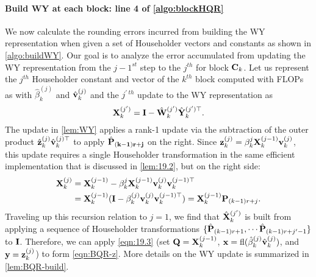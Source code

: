 \paragraph{Build WY at each block: line 4 of \cref{algo:blockHQR}}
We now calculate the rounding errors incurred from building the WY representation when given a set of Householder vectors and constants as shown in \cref{algo:buildWY}.
Our goal is to analyze the error accumulated from updating the WY representation from the $j-1^{st}$ step to the $j^{th}$ for block $\mathbf{C}_{k}$.
Let us represent the $j^{th}$ Householder constant and vector of the $k^{th}$ block computed with FLOPs as with $\hat{\beta}_k^{(j)}$ and $\hat{\mathbf{v}}_{k}^{(j)}$ and the $j^{'\ th}$ update to the WY representation as $$\mathbf{X}_{k}^{(j')} = \mathbf{I} - \hat{\mathbf{W}}_{k}^{(j')}\hat{\mathbf{Y}}_{k}^{(j')\top}.$$ %
The update in \cref{lem:WY} applies a rank-1 update via the subtraction of the outer product $\hat{\mathbf{z}}_{k}^{(j)}\hat{\mathbf{v}}_{k}^{(j)\top}$ to apply $\hat{\mathbf{P}}_{\mathbf{(k-1)r+j}}$ on the right. 
Since $\mathbf{z}_{k}^{(j)} = \beta_k^{j}\mathbf{X}_{k}^{(j-1)}\mathbf{v}_{k}^{(j)}$, this update requires a single Householder transformation in the same efficient implementation that is discussed in \cref{lem:19.2}, but on the right side:
\begin{align*}
	\mathbf{X}_{k}^{(j)} &= \mathbf{X}_{k}^{(j-1)}-\beta_k^{j}\mathbf{X}_{k}^{(j-1)}\mathbf{v}_{k}^{(j)}\mathbf{v}_{k}^{(j-1)\top} \\
	&= \mathbf{X}_{k}^{(j-1)} (\mathbf{I}-\beta_k^{(j)}\mathbf{v}_{k}^{(j)}\mathbf{v}_{k}^{(j-1)\top})=  \mathbf{X}_{k}^{(j-1)}\mathbf{P}_{(k-1)r+j}.
\end{align*}
Traveling up this recursion relation to $j=1$, we find that $\hat{\mathbf{X}}_{k}^{(j')}$ is built from applying a sequence of Householder transformations $\{\hat{\mathbf{P}}_{(k-1)r+1},\cdots \hat{\mathbf{P}}_{(k-1)r+j'-1}\}$ to $\mathbf{I}$.
Therefore, we can apply \cref{eqn:19.3} (set $\mathbf{Q}=\mathbf{X}_{k}^{(j-1)}$, $\mathbf{x}=\mathrm{fl}(\hat{\beta}_k^{(j)}\hat{\mathbf{v}}_{k}^{(j)})$, and $\mathbf{y}=\mathbf{z}_{k}^{(j)}$) to form \cref{eqn:BQR-z}.
More details on the WY update is summarized in \cref{lem:BQR-build}.
